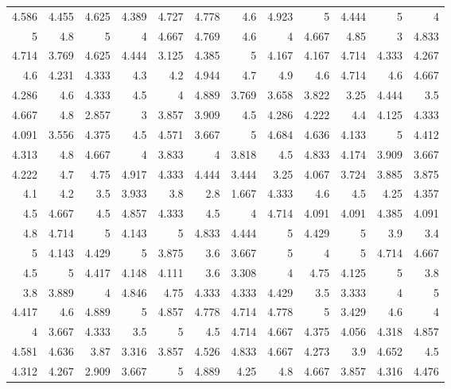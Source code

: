 \documentclass[10pt]{report}
\begin{document}
\begin{table}
\begin{tabular}{rrrrrrrrrrrr}
	4.586 & 4.455 & 4.625 & 4.389 & 4.727 & 4.778 & 4.6   & 4.923 & 5     & 4.444 & 5     & 4     \\
	5     & 4.8   & 5     & 4     & 4.667 & 4.769 & 4.6   & 4     & 4.667 & 4.85  & 3     & 4.833 \\
	4.714 & 3.769 & 4.625 & 4.444 & 3.125 & 4.385 & 5     & 4.167 & 4.167 & 4.714 & 4.333 & 4.267 \\
	4.6   & 4.231 & 4.333 & 4.3   & 4.2   & 4.944 & 4.7   & 4.9   & 4.6   & 4.714 & 4.6   & 4.667 \\
	4.286 & 4.6   & 4.333 & 4.5   & 4     & 4.889 & 3.769 & 3.658 & 3.822 & 3.25  & 4.444 & 3.5   \\
	4.667 & 4.8   & 2.857 & 3     & 3.857 & 3.909 & 4.5   & 4.286 & 4.222 & 4.4   & 4.125 & 4.333 \\
	4.091 & 3.556 & 4.375 & 4.5   & 4.571 & 3.667 & 5     & 4.684 & 4.636 & 4.133 & 5     & 4.412 \\
	4.313 & 4.8   & 4.667 & 4     & 3.833 & 4     & 3.818 & 4.5   & 4.833 & 4.174 & 3.909 & 3.667 \\
	4.222 & 4.7   & 4.75  & 4.917 & 4.333 & 4.444 & 3.444 & 3.25  & 4.067 & 3.724 & 3.885 & 3.875 \\
	4.1   & 4.2   & 3.5   & 3.933 & 3.8   & 2.8   & 1.667 & 4.333 & 4.6   & 4.5   & 4.25  & 4.357 \\
	4.5   & 4.667 & 4.5   & 4.857 & 4.333 & 4.5   & 4     & 4.714 & 4.091 & 4.091 & 4.385 & 4.091 \\
	4.8   & 4.714 & 5     & 4.143 & 5     & 4.833 & 4.444 & 5     & 4.429 & 5     & 3.9   & 3.4   \\
	5     & 4.143 & 4.429 & 5     & 3.875 & 3.6   & 3.667 & 5     & 4     & 5     & 4.714 & 4.667 \\
	4.5   & 5     & 4.417 & 4.148 & 4.111 & 3.6   & 3.308 & 4     & 4.75  & 4.125 & 5     & 3.8   \\
	3.8   & 3.889 & 4     & 4.846 & 4.75  & 4.333 & 4.333 & 4.429 & 3.5   & 3.333 & 4     & 5     \\
	4.417 & 4.6   & 4.889 & 5     & 4.857 & 4.778 & 4.714 & 4.778 & 5     & 3.429 & 4.6   & 4     \\
	4     & 3.667 & 4.333 & 3.5   & 5     & 4.5   & 4.714 & 4.667 & 4.375 & 4.056 & 4.318 & 4.857 \\
	4.581 & 4.636 & 3.87  & 3.316 & 3.857 & 4.526 & 4.833 & 4.667 & 4.273 & 3.9   & 4.652 & 4.5   \\
	4.312 & 4.267 & 2.909 & 3.667 & 5     & 4.889 & 4.25  & 4.8   & 4.667 & 3.857 & 4.316 & 4.476 \\

\end{tabular}
\end{table}
\end{document}
